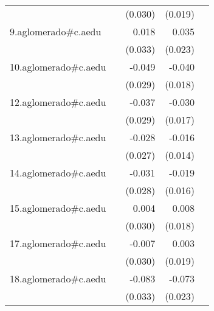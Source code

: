 {\begin{longtable}{l*{4}{D{.}{.}{-1}}}
            &                     &     (0.030)         &     (0.019)         &                     \\
\addlinespace
9.aglomerado#c.aedu&                     &       0.018         &       0.035         &                     \\
            &                     &     (0.033)         &     (0.023)         &                     \\
\addlinespace
10.aglomerado#c.aedu&                     &      -0.049         &      -0.040\sym{*}  &                     \\
            &                     &     (0.029)         &     (0.018)         &                     \\
\addlinespace
12.aglomerado#c.aedu&                     &      -0.037         &      -0.030         &                     \\
            &                     &     (0.029)         &     (0.017)         &                     \\
\addlinespace
13.aglomerado#c.aedu&                     &      -0.028         &      -0.016         &                     \\
            &                     &     (0.027)         &     (0.014)         &                     \\
\addlinespace
14.aglomerado#c.aedu&                     &      -0.031         &      -0.019         &                     \\
            &                     &     (0.028)         &     (0.016)         &                     \\
\addlinespace
15.aglomerado#c.aedu&                     &       0.004         &       0.008         &                     \\
            &                     &     (0.030)         &     (0.018)         &                     \\
\addlinespace
17.aglomerado#c.aedu&                     &      -0.007         &       0.003         &                     \\
            &                     &     (0.030)         &     (0.019)         &                     \\
\addlinespace
18.aglomerado#c.aedu&                     &      -0.083\sym{*}  &      -0.073\sym{**} &                     \\
            &                     &     (0.033)         &     (0.023)         &                     \\

\end{longtable}}
